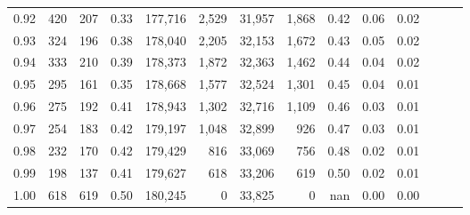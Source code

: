 \begin{tabular}{rrrrrrrrrrrrrr}
0.92 &    420 &  207 &  0.33 &  177,716 &    2,529 &  31,957 &   1,868 &  0.42 &  0.06 &      0.02 \\
0.93 &    324 &  196 &  0.38 &  178,040 &    2,205 &  32,153 &   1,672 &  0.43 &  0.05 &      0.02 \\
0.94 &    333 &  210 &  0.39 &  178,373 &    1,872 &  32,363 &   1,462 &  0.44 &  0.04 &      0.02 \\
0.95 &    295 &  161 &  0.35 &  178,668 &    1,577 &  32,524 &   1,301 &  0.45 &  0.04 &      0.01 \\
0.96 &    275 &  192 &  0.41 &  178,943 &    1,302 &  32,716 &   1,109 &  0.46 &  0.03 &      0.01 \\
0.97 &    254 &  183 &  0.42 &  179,197 &    1,048 &  32,899 &     926 &  0.47 &  0.03 &      0.01 \\
0.98 &    232 &  170 &  0.42 &  179,429 &      816 &  33,069 &     756 &  0.48 &  0.02 &      0.01 \\
0.99 &    198 &  137 &  0.41 &  179,627 &      618 &  33,206 &     619 &  0.50 &  0.02 &      0.01 \\
1.00 &    618 &  619 &  0.50 &  180,245 &        0 &  33,825 &       0 &   nan &  0.00 &      0.00 \\
\bottomrule
\end{tabular}
